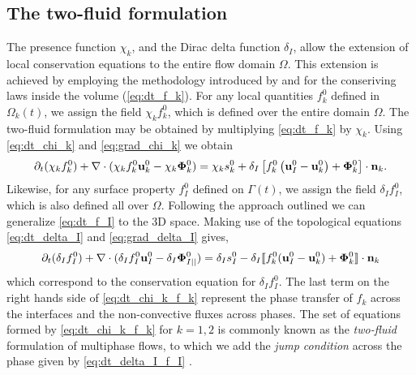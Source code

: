 \subsection{The two-fluid formulation}
The presence function $\chi_k$, and the Dirac delta function $\delta_I$, allow the extension of local conservation equations to the entire flow domain $\Omega$. 
This extension is achieved by employing the methodology introduced by \citet{drew1983mathematical} and \citet{kataoka1986local} for the conseriving laws inside the volume (\ref{eq:dt_f_k}).
For any local quantities $f_k^0$ defined in $\Omega_k(t)$, we assign the field $\chi_k f_k^0$, which is defined over the entire domain $\Omega$. The two-fluid formulation may be obtained by multiplying \ref{eq:dt_f_k} by $\chi_k$. 
Using \ref{eq:dt_chi_k} and \ref{eq:grad_chi_k} we obtain
\begin{equation}
    \partial_t (\chi_k f_k^0)
    + \mathbf{\nabla}\cdot (
        \chi_k f_k^0 \textbf{u}_k^0
        - \chi_k \mathbf{\Phi}_k^0 
        )
    = 
    \chi_k s_k^0
    + \delta_I\left[
        f_k^0
        \left(
            \textbf{u}_I^0
            - \textbf{u}_k^0
        \right)
        + \mathbf{\Phi}_k^0
    \right]
    \cdot \textbf{n}_k.
    \label{eq:dt_chi_k_f_k}
\end{equation}
Likewise, for any surface property $f_I^0$ defined on $\Gamma(t)$, we assign the field $\delta_I f_I^0$, which is also defined all over $\Omega$. 
Following the approach outlined \citet[Appendix 2]{marle1982macroscopic} we can generalize \ref{eq:dt_f_I} to the 3D space. 
Making use of the topological equations \ref{eq:dt_delta_I} and \ref{eq:grad_delta_I} gives,
\begin{equation}
    \partial_t (\delta_If_I^0)  
    + \mathbf{\nabla}\cdot (
        \delta_I f_I^0 \textbf{u}_I^0
        - \delta_I \mathbf{\Phi}_{I||}^0 
        )
    = 
    \delta_Is_I^0
    - \delta_I\llbracket 
    f_k^0 (\textbf{u}_I^0 - \textbf{u}_k^0)
    + \mathbf{\Phi}_k^0 \rrbracket \cdot \textbf{n}_k 
    \label{eq:dt_delta_I_f_I}
\end{equation}
which correspond to the conservation equation for $\delta_If_I^0$.
The last term on the right hands side of \ref{eq:dt_chi_k_f_k} represent the phase transfer of $f_k$ across the interfaces and the non-convective fluxes across phases.
The set of equations formed by \ref{eq:dt_chi_k_f_k} for $k =1,2$ is commonly known as the \textit{two-fluid} formulation of multiphase flows, to which we add the \textit{jump condition} across the phase given by \ref{eq:dt_delta_I_f_I} \citep{morel2015mathematical,tryggvason2011direct,drew1983mathematical,kataoka1986local}. 

